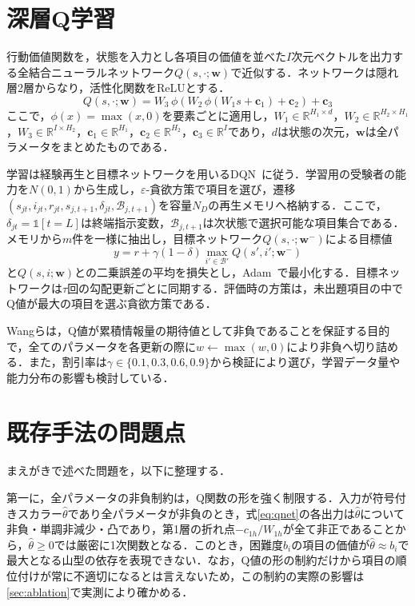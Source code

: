\documentclass[a4paper,12pt,oneside,openany]{jsbook}
\begin{document}
\section{深層Q学習}\label{sec:dqn}

行動価値関数を，状態を入力とし各項目の価値を並べた$I$次元ベクトルを出力する全結合ニューラルネットワーク$Q(s,\cdot;\bm{w})$で近似する．ネットワークは隠れ層2層からなり，活性化関数をReLUとする．
\begin{equation}
 Q(s,\cdot;\bm{w})=W_3\,\phi\!\left(W_2\,\phi(W_1s+\bm{c}_1)+\bm{c}_2\right)+\bm{c}_3
 \label{eq:qnet}
\end{equation}
ここで，$\phi(x)=\max(x,0)$を要素ごとに適用し，$W_1\in\mathbb{R}^{H_1\times d}$，$W_2\in\mathbb{R}^{H_2\times H_1}$，$W_3\in\mathbb{R}^{I\times H_2}$，$\bm{c}_1\in\mathbb{R}^{H_1}$，$\bm{c}_2\in\mathbb{R}^{H_2}$，$\bm{c}_3\in\mathbb{R}^I$であり，$d$は状態の次元，$\bm{w}$は全パラメータをまとめたものである．

学習は経験再生と目標ネットワークを用いるDQN~\cite{Mnih2015}に従う．学習用の受験者の能力を$N(0,1)$から生成し，$\varepsilon$-貪欲方策で項目を選び，遷移$(s_{jt},i_{jt},r_{jt},s_{j,t+1},\delta_{jt},\mathcal{B}_{j,t+1})$を容量$N_D$の再生メモリへ格納する．ここで，$\delta_{jt}=\mathbb{1}[t=L]$は終端指示変数，$\mathcal{B}_{j,t+1}$は次状態で選択可能な項目集合である．メモリから$m$件を一様に抽出し，目標ネットワーク$Q(s,\cdot;\bm{w}^-)$による目標値
\begin{equation}
 y=r+\gamma(1-\delta)\max_{i'\in\mathcal{B}'}Q(s',i';\bm{w}^-)
 \label{eq:target}
\end{equation}
と$Q(s,i;\bm{w})$との二乗誤差の平均を損失とし，Adam~\cite{KingmaBa2015}で最小化する．目標ネットワークは$\tau$回の勾配更新ごとに同期する．評価時の方策は，未出題項目の中でQ値が最大の項目を選ぶ貪欲方策である．

Wangらは，Q値が累積情報量の期待値として非負であることを保証する目的で，全てのパラメータを各更新の際に$w\leftarrow\max(w,0)$により非負へ切り詰める．また，割引率は$\gamma\in\{0.1,0.3,0.6,0.9\}$から検証により選び，学習データ量や能力分布の影響も検討している．

\section{既存手法の問題点}\label{sec:gap}

まえがきで述べた問題を，以下に整理する．

第一に，全パラメータの非負制約は，Q関数の形を強く制限する．入力が符号付きスカラー$\hat\theta$であり全パラメータが非負のとき，式\eqref{eq:qnet}の各出力は$\hat\theta$について非負・単調非減少・凸であり，第1層の折れ点$-c_{1h}/W_{1h}$が全て非正であることから，$\hat\theta\ge0$では厳密に1次関数となる．このとき，困難度$b_i$の項目の価値が$\hat\theta\approx b_i$で最大となる山型の依存を表現できない．なお，Q値の形の制約だけから項目の順位付けが常に不適切になるとは言えないため，この制約の実際の影響は\ref{sec:ablation}で実測により確かめる．
\end{document}
